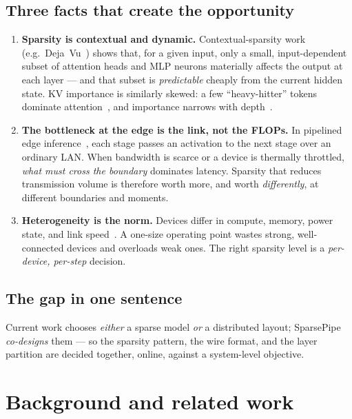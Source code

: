 \documentclass[11pt]{article}
\newcommand{\term}[1]{\textbf{\color{accent!85!black}#1}}
\begin{document}
\subsection{Three facts that create the opportunity}
\begin{enumerate}[leftmargin=1.5em,itemsep=2pt]
\item \term{Sparsity is contextual and dynamic.} Contextual-sparsity work (e.g.\
Deja~Vu~\cite{dejavu}) shows that, for a given input, only a small, input-dependent subset
of attention heads and MLP neurons materially affects the output at each layer --- and that
subset is \emph{predictable} cheaply from the current hidden state. KV importance is
similarly skewed: a few ``heavy-hitter'' tokens dominate attention~\cite{h2o}, and
importance narrows with depth~\cite{pyramidkv}.
\item \term{The bottleneck at the edge is the link, not the FLOPs.} In pipelined edge
inference~\cite{poster,jupiter}, each stage passes an activation to the next stage over an
ordinary LAN. When bandwidth is scarce or a device is thermally throttled, \emph{what must
cross the boundary} dominates latency. Sparsity that reduces transmission volume is
therefore worth more, and worth \emph{differently}, at different boundaries and moments.
\item \term{Heterogeneity is the norm.} Devices differ in compute, memory, power state, and
link speed~\cite{hexgen,foci}. A one-size operating point wastes strong, well-connected
devices and overloads weak ones. The right sparsity level is a \emph{per-device, per-step}
decision.
\end{enumerate}

\subsection{The gap in one sentence}
Current work chooses \emph{either} a sparse model \emph{or} a distributed layout; SparsePipe
\emph{co-designs} them --- so the sparsity pattern, the wire format, and the layer partition
are decided together, online, against a system-level objective.

\section{Background and related work}
\end{document}

